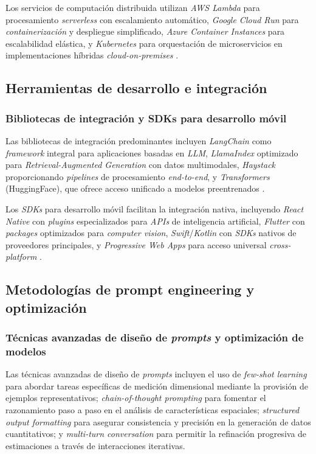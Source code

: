Los servicios de computación distribuida utilizan \textit{AWS Lambda} para procesamiento \textit{serverless} con escalamiento automático, \textit{Google Cloud Run} para \textit{containerización} y despliegue simplificado, \textit{Azure Container Instances} para escalabilidad elástica, y \textit{Kubernetes} para orquestación de microservicios en implementaciones híbridas \textit{cloud-on-premises} \cite{Dosovitskiy2020, ArticleRef255138}.


\subsection{Herramientas de desarrollo e integración}

\subsubsection{Bibliotecas de integración y SDKs para desarrollo móvil}

Las bibliotecas de integración predominantes incluyen \textit{LangChain} como \textit{framework} integral para aplicaciones basadas en \textit{LLM}, \textit{LlamaIndex} optimizado para \textit{Retrieval-Augmented Generation} con datos multimodales, \textit{Haystack} proporcionando \textit{pipelines} de procesamiento \textit{end-to-end}, y \textit{Transformers} (HuggingFace), que ofrece acceso unificado a modelos preentrenados \cite{Dosovitskiy2020, ArticleRef255139}.

Los \textit{SDKs} para desarrollo móvil facilitan la integración nativa, incluyendo \textit{React Native} con \textit{plugins} especializados para \textit{APIs} de inteligencia artificial, \textit{Flutter} con \textit{packages} optimizados para \textit{computer vision}, \textit{Swift}/\textit{Kotlin} con \textit{SDKs} nativos de proveedores principales, y \textit{Progressive Web Apps} para acceso universal \textit{cross-platform} \cite{Anthopic2025}.


\subsection{Metodologías de prompt engineering y optimización}

\subsubsection{Técnicas avanzadas de diseño de \textit{prompts} y optimización de modelos}

Las técnicas avanzadas de diseño de \textit{prompts} incluyen el uso de \textit{few-shot learning} para abordar tareas específicas de medición dimensional mediante la provisión de ejemplos representativos; \textit{chain-of-thought prompting} para fomentar el razonamiento paso a paso en el análisis de características espaciales; \textit{structured output formatting} para asegurar consistencia y precisión en la generación de datos cuantitativos; y \textit{multi-turn conversation} para permitir la refinación progresiva de estimaciones a través de interacciones iterativas.

